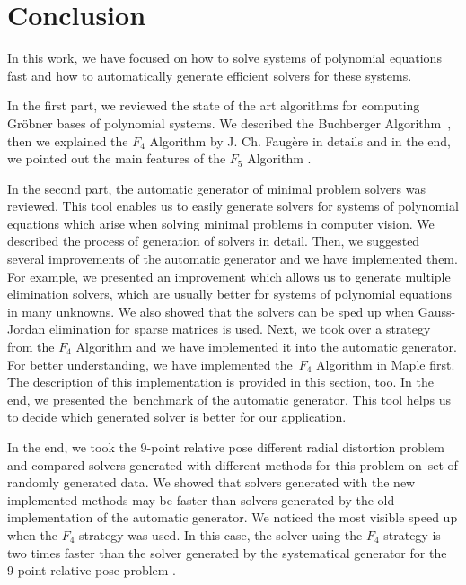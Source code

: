 \chapter{Conclusion}
In this work, we have focused on how to solve systems of polynomial equations fast and how to automatically generate efficient solvers for these systems.

In the first part, we reviewed the state of the art algorithms for computing Gr\"obner bases of polynomial systems. We described the Buchberger Algorithm~\cite{Buchberger65}, then we explained the $F_4$ Algorithm \cite{F4} by J. Ch. Faug\`ere in details and in the end, we pointed out the main features of the $F_5$ Algorithm \cite{F5}.

In the second part, the automatic generator \cite{AutoGen} of minimal problem solvers was reviewed. This tool enables us to easily generate solvers for systems of polynomial equations which arise when solving minimal problems in computer vision. We described the process of generation of solvers in detail. Then, we suggested several improvements of the automatic generator and we have implemented them. For example, we presented an improvement which allows us to generate multiple elimination solvers, which are usually better for systems of polynomial equations in many unknowns. We also showed that the solvers can be sped up when Gauss-Jordan elimination for sparse matrices is used. Next, we took over a strategy from the $F_4$ Algorithm \cite{F4} and we have implemented it into the automatic generator. For better understanding, we have implemented the~$F_4$ Algorithm \cite{F4} in Maple first. The description of this implementation is provided in this section, too. In the end, we presented the~benchmark of the automatic generator. This tool helps us to decide which generated solver is better for our application.

In the end, we took the 9-point relative pose different radial distortion problem~\cite{9pt} and compared solvers generated with different methods for this problem on~set of randomly generated data. We showed that solvers generated with the new implemented methods may be faster than solvers generated by the old implementation of the automatic generator. We noticed the most visible speed up when the $F_4$ strategy was used. In this case, the solver using the $F_4$ strategy is two times faster than the solver generated by the systematical generator for the 9-point relative pose problem \cite{9pt}.
